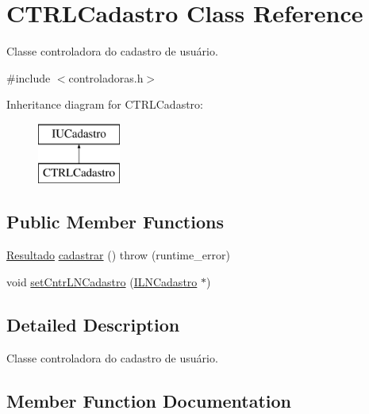 \hypertarget{classCTRLCadastro}{}\section{C\+T\+R\+L\+Cadastro Class Reference}
\label{classCTRLCadastro}


Classe controladora do cadastro de usuário.  




{\ttfamily \#include $<$controladoras.\+h$>$}

Inheritance diagram for C\+T\+R\+L\+Cadastro\+:\begin{figure}[H]
\begin{center}
\leavevmode
\includegraphics[height=2.000000cm]{classCTRLCadastro}
\end{center}
\end{figure}
\subsection*{Public Member Functions}
\begin{DoxyCompactItemize}
\item 
\hyperlink{classResultado}{Resultado} \hyperlink{classCTRLCadastro_a22e15e47f34bb629a27204be76abf69c}{cadastrar} ()  throw (runtime\+\_\+error)
\item 
void \hyperlink{classCTRLCadastro_aa9324e682be46537c44c2feb33e05991}{set\+Cntr\+L\+N\+Cadastro} (\hyperlink{classILNCadastro}{I\+L\+N\+Cadastro} $\ast$)
\end{DoxyCompactItemize}


\subsection{Detailed Description}
Classe controladora do cadastro de usuário. 

\subsection{Member Function Documentation}
\mbox{\label{classCTRLCadastro_a22e15e47f34bb629a27204be76abf69c}} 
